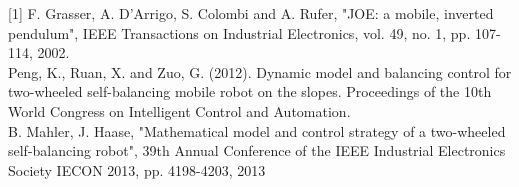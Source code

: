 [1] F. Grasser, A. D'Arrigo, S. Colombi and A. Rufer, "JOE: a mobile, inverted pendulum", IEEE Transactions on Industrial Electronics, vol. 49, no. 1, pp. 107-114, 2002.\\


\noindent
[2] Peng, K., Ruan, X. and Zuo, G. (2012). Dynamic model and balancing control for two-wheeled self-balancing mobile robot on the slopes. Proceedings of the 10th World Congress on Intelligent Control and Automation.\\
\noindent
[3] B. Mahler, J. Haase, "Mathematical model and control strategy of a two-wheeled self-balancing robot", 39th Annual Conference of the IEEE Industrial Electronics Society IECON 2013, pp. 4198-4203, 2013
